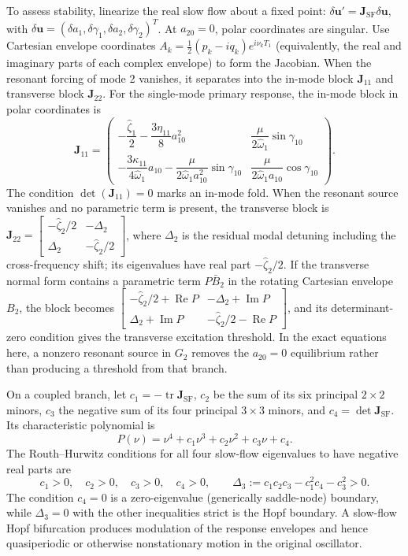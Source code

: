 \documentclass[11pt]{article}
\begin{document}
To assess stability, linearize the real slow flow about a fixed point: $\delta\mathbf{u}'=\mathbf{J}_{\mathrm{SF}}\delta\mathbf{u}$, with $\delta\mathbf{u}=(\delta a_1,\delta\gamma_1,\delta a_2,\delta\gamma_2)^T$. At $a_{20}=0$, polar coordinates are singular. Use Cartesian envelope coordinates $A_k=\tfrac12(p_k-iq_k)e^{i\nu_kT_1}$ (equivalently, the real and imaginary parts of each complex envelope) to form the Jacobian. When the resonant forcing of mode 2 vanishes, it separates into the in-mode block $\mathbf{J}_{11}$ and transverse block $\mathbf{J}_{22}$. For the single-mode primary response, the in-mode block in polar coordinates is
\[
\mathbf{J}_{11}=\begin{pmatrix}
-\dfrac{\hat\zeta_1}{2}-\dfrac{3\eta_{11}}{8}a_{10}^2 & \dfrac{\mu}{2\hat\omega_1}\sin\gamma_{10}\\[4pt]
-\dfrac{3\kappa_{11}}{4\hat\omega_1}a_{10}-\dfrac{\mu}{2\hat\omega_1a_{10}^2}\sin\gamma_{10} & \dfrac{\mu}{2\hat\omega_1a_{10}}\cos\gamma_{10}
\end{pmatrix}.
\]
The condition $\det(\mathbf{J}_{11})=0$ marks an in-mode fold. When the resonant source vanishes and no parametric term is present, the transverse block is $\mathbf{J}_{22}=\left[\begin{smallmatrix}-\hat\zeta_2/2&-\Delta_2\\ \Delta_2&-\hat\zeta_2/2\end{smallmatrix}\right]$, where $\Delta_2$ is the residual modal detuning including the cross-frequency shift; its eigenvalues have real part $-\hat\zeta_2/2$. If the transverse normal form contains a parametric term $P\bar B_2$ in the rotating Cartesian envelope $B_2$, the block becomes $\left[\begin{smallmatrix}-\hat\zeta_2/2+\operatorname{Re}P&-\Delta_2+\operatorname{Im}P\\ \Delta_2+\operatorname{Im}P&-\hat\zeta_2/2-\operatorname{Re}P\end{smallmatrix}\right]$, and its determinant-zero condition gives the transverse excitation threshold. In the exact equations here, a nonzero resonant source in $G_2$ removes the $a_{20}=0$ equilibrium rather than producing a threshold from that branch.

On a coupled branch, let $c_1=-\operatorname{tr}\mathbf{J}_{\mathrm{SF}}$, $c_2$ be the sum of its six principal $2\times2$ minors, $c_3$ the negative sum of its four principal $3\times3$ minors, and $c_4=\det\mathbf{J}_{\mathrm{SF}}$. Its characteristic polynomial is
\begin{equation}\label{eq:slowflow-characteristic}
P(\nu)=\nu^4+c_1\nu^3+c_2\nu^2+c_3\nu+c_4.
\end{equation}
The Routh--Hurwitz conditions for all four slow-flow eigenvalues to have negative real parts are
\[
c_1>0,\quad c_2>0,\quad c_3>0,\quad c_4>0,\qquad
\Delta_3:=c_1c_2c_3-c_1^2c_4-c_3^2>0.
\]
The condition $c_4=0$ is a zero-eigenvalue (generically saddle-node) boundary, while $\Delta_3=0$ with the other inequalities strict is the Hopf boundary. A slow-flow Hopf bifurcation produces modulation of the response envelopes and hence quasiperiodic or otherwise nonstationary motion in the original oscillator.
\end{document}
